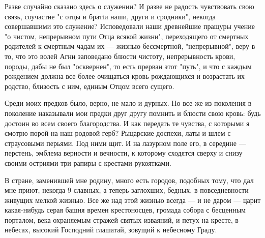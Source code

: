 \documentclass[12pt,russian]{article}
\begin{document}
Разве случайно сказано здесь о служении? И разве не радость чувствовать свою связь,  соучастие "с отцы  и  братiи наши, други и  сродники",  некогда совершавшими  это  служение? Исповедовали наши древнейшие пращуры учение  "о чистом,  непрерывном  пути  Отца  всякой  жизни",  переходящего от  смертных родителей к смертным чадам  их \cdash---  жизнью бессмертной, "непрерывной", веру в то,  что это  волей Агни  заповедано  блюсти  чистоту, непрерывность  крови, породы, дабы не был "осквернен", то есть прерван этот "путь", и что с каждым рождением  должна  все более  очищаться кровь рождающихся  и  возрастать  их родство, близость с ним, единым Отцом всего сущего.

Среди моих  предков  было, верно,  не  мало  и  дурных. Но  все  же  из поколения в поколение наказывали мои предки друг другу помнить и блюсти свою кровь: будь достоин во  всем своего благородства. И как передать те чувства, с которыми я  смотрю порой  на  наш родовой  герб? Рыцарские доспехи, латы и шлем с страусовыми перьями. Под ними щит. И на лазурном поле его, в середине \cdash--- перстень, эмблема верности и вечности, к которому сходятся сверху и снизу своими остриями три рапиры с крестами-рукоятками.

В стране, заменившей мне родину, много есть городов, подобных тому, что дал  мне  приют,  некогда  {9}  славных,   а  теперь  заглохших,  бедных,  в повседневности живущих  мелкой жизнью. Все же над этой жизнью всегда \cdash--- и не даром \cdash--- царит какая-нибудь серая башня времен  крестоносцев, громада собора с бесценным порталом, века  охраняемым  стражей  святых изваяний, и петух на кресте, в небесах, высокий Господний глашатай, зовущий к небесному Граду.
\end{document}
